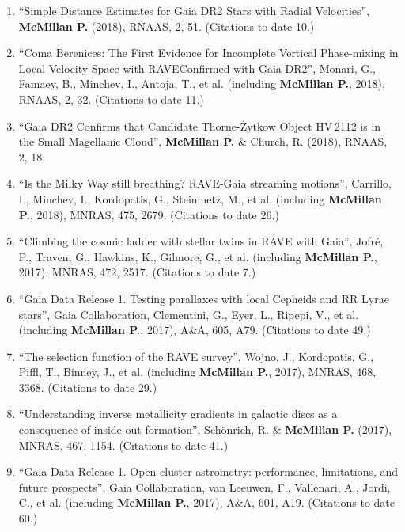 \documentclass{resume}
\begin{document}
\begin{enumerate}
\item ``Simple Distance Estimates for Gaia DR2 Stars with Radial Velocities'', \textbf{McMillan P.} (2018), RNAAS, 2, 51. (Citations to date 10.)

\item ``Coma Berenices: The First Evidence for Incomplete Vertical Phase-mixing in Local Velocity Space with RAVE{\textemdash}Confirmed with Gaia DR2'', Monari, G., Famaey, B., Minchev, I., Antoja, T., et al. (including \textbf{McMillan P.}, 2018), RNAAS, 2, 32. (Citations to date 11.)

\item ``Gaia DR2 Confirms that Candidate Thorne-\.Zytkow Object HV\,2112 is in the Small Magellanic Cloud'', \textbf{McMillan P.} \& Church, R. (2018), RNAAS, 2, 18.

\item ``Is the Milky Way still breathing? RAVE-Gaia streaming motions'', Carrillo, I., Minchev, I., Kordopatis, G., Steinmetz, M., et al. (including \textbf{McMillan P.}, 2018), MNRAS, 475, 2679. (Citations to date 26.)

\item ``Climbing the cosmic ladder with stellar twins in RAVE with Gaia'', Jofr\'e, P., Traven, G., Hawkins, K., Gilmore, G., et al. (including \textbf{McMillan P.}, 2017), MNRAS, 472, 2517. (Citations to date 7.)

\item ``Gaia Data Release 1. Testing parallaxes with local Cepheids and RR Lyrae stars'', Gaia Collaboration, Clementini, G., Eyer, L., Ripepi, V., et al. (including \textbf{McMillan P.}, 2017), A\&A, 605, A79. (Citations to date 49.)

\item ``The selection function of the RAVE survey'', Wojno, J., Kordopatis, G., Piffl, T., Binney, J., et al. (including \textbf{McMillan P.}, 2017), MNRAS, 468, 3368. (Citations to date 29.)

\item ``Understanding inverse metallicity gradients in galactic discs as a consequence of inside-out formation'', Sch\"onrich, R. \& \textbf{McMillan P.} (2017), MNRAS, 467, 1154. (Citations to date 41.)

\item ``Gaia Data Release 1. Open cluster astrometry: performance, limitations, and future prospects'', Gaia Collaboration, van Leeuwen, F., Vallenari, A., Jordi, C., et al. (including \textbf{McMillan P.}, 2017), A\&A, 601, A19. (Citations to date 60.)


\end{enumerate}
\end{document}
